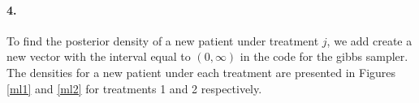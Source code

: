 \documentclass[12pt, leqno]{article}
\begin{document}
\paragraph{4.}

To find the posterior density of a new patient under treatment $j$, we
add create a new vector with the interval equal to $(0, \infty)$ in
the code for the gibbs sampler. The densities for a new patient under each treatment are
presented in Figures \ref{ml1} and \ref{ml2} for treatments 1 and 2 respectively.

\begin{figure}
\centering
{}
\centering
\qquad
\centering
{}
\end{figure}
\end{document}
